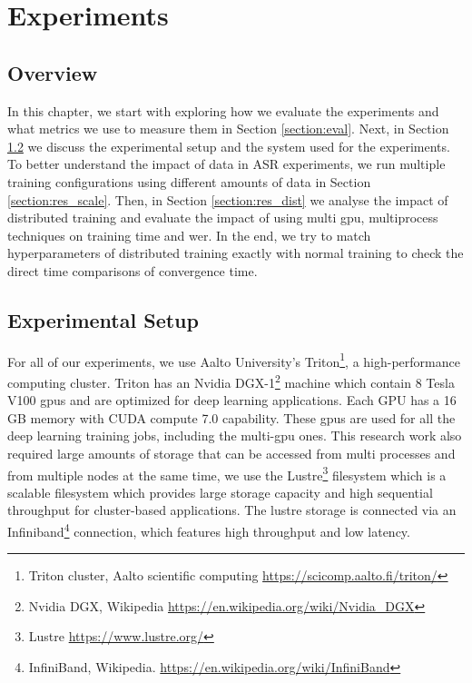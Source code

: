 \chapter{Experiments}
\label{chapter:evaluation}


\section{Overview}
In this chapter, we start with exploring how we evaluate the experiments and what metrics we use to measure them in Section \ref{section:eval}. Next, in Section \ref{section:trit} we discuss the experimental setup and the system used for the experiments. To better understand the impact of data in ASR experiments, we run multiple training configurations using different amounts of data in Section \ref{section:res_scale}. Then, in Section \ref{section:res_dist} we analyse the impact of distributed training and evaluate the impact of using multi \acrshort{gpu}, multiprocess techniques on training time and \acrshort{wer}. In the end, we try to match hyperparameters of distributed training exactly with normal training to check the direct time comparisons of convergence time. 


\section{Experimental Setup}
\label{section:trit}
For all of our experiments, we use Aalto University's Triton\footnote{Triton cluster, Aalto scientific computing \href{https://scicomp.aalto.fi/triton/}{https://scicomp.aalto.fi/triton/}}, a high-performance computing cluster. Triton has an Nvidia DGX-1\footnote{Nvidia DGX, Wikipedia \href{https://en.wikipedia.org/wiki/Nvidia_DGX}{https://en.wikipedia.org/wiki/Nvidia\_DGX}} machine which contain 8 Tesla V100 \acrshort{gpu}s and are optimized for deep learning applications. Each GPU has a 16 GB memory with CUDA compute 7.0 capability. These \acrshort{gpu}s are used for all the deep learning training jobs, including the multi-\acrshort{gpu} ones. This research work also required large amounts of storage that can be accessed from multi processes and from multiple nodes at the same time, we use the Lustre\footnote{Lustre \href{https://www.lustre.org/}{https://www.lustre.org/}} filesystem which is a scalable filesystem which provides large storage capacity and high sequential throughput for cluster-based applications. The lustre storage is connected via an Infiniband\footnote{InfiniBand, Wikipedia. \href{https://en.wikipedia.org/wiki/InfiniBand}{https://en.wikipedia.org/wiki/InfiniBand}} connection, which features high throughput and low latency.


